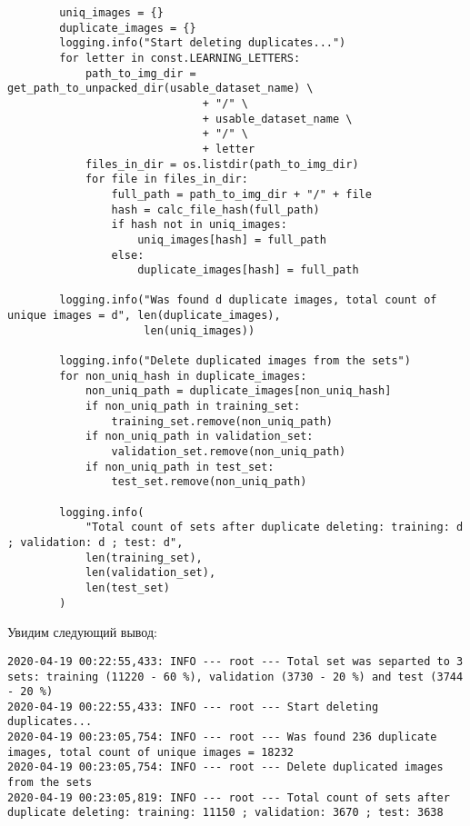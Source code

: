 \begin{lstlisting}
        uniq_images = {}
        duplicate_images = {}
        logging.info("Start deleting duplicates...")
        for letter in const.LEARNING_LETTERS:
            path_to_img_dir = get_path_to_unpacked_dir(usable_dataset_name) \
                              + "/" \
                              + usable_dataset_name \
                              + "/" \
                              + letter
            files_in_dir = os.listdir(path_to_img_dir)
            for file in files_in_dir:
                full_path = path_to_img_dir + "/" + file
                hash = calc_file_hash(full_path)
                if hash not in uniq_images:
                    uniq_images[hash] = full_path
                else:
                    duplicate_images[hash] = full_path

        logging.info("Was found d duplicate images, total count of unique images = d", len(duplicate_images),
                     len(uniq_images))

        logging.info("Delete duplicated images from the sets")
        for non_uniq_hash in duplicate_images:
            non_uniq_path = duplicate_images[non_uniq_hash]
            if non_uniq_path in training_set:
                training_set.remove(non_uniq_path)
            if non_uniq_path in validation_set:
                validation_set.remove(non_uniq_path)
            if non_uniq_path in test_set:
                test_set.remove(non_uniq_path)

        logging.info(
            "Total count of sets after duplicate deleting: training: d ; validation: d ; test: d",
            len(training_set),
            len(validation_set),
            len(test_set)
        )
\end{lstlisting}

Увидим следующий вывод:

\begin{lstlisting}
2020-04-19 00:22:55,433: INFO --- root --- Total set was separted to 3 sets: training (11220 - 60 %), validation (3730 - 20 %) and test (3744 - 20 %)
2020-04-19 00:22:55,433: INFO --- root --- Start deleting duplicates...
2020-04-19 00:23:05,754: INFO --- root --- Was found 236 duplicate images, total count of unique images = 18232
2020-04-19 00:23:05,754: INFO --- root --- Delete duplicated images from the sets
2020-04-19 00:23:05,819: INFO --- root --- Total count of sets after duplicate deleting: training: 11150 ; validation: 3670 ; test: 3638
\end{lstlisting}

